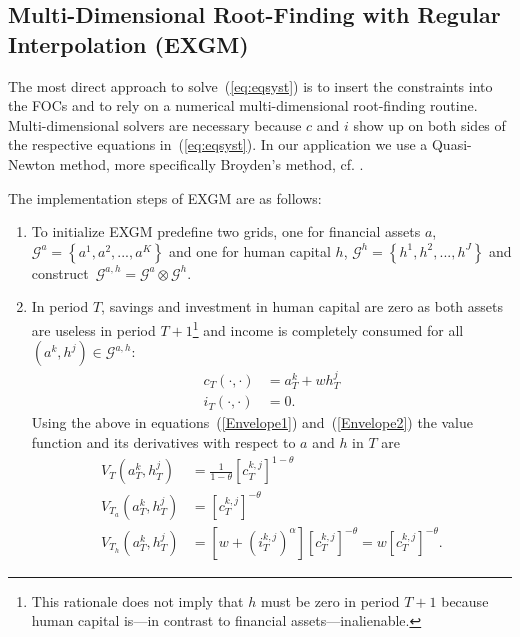 \documentclass[a4paper,12pt]{article}
\begin{document}
\subsection{Multi-Dimensional Root-Finding with Regular Interpolation (EXGM)}

The most direct approach to solve~(\ref{eq:eqsyst}) is to insert the constraints into the FOCs and to rely on a numerical multi-dimensional root-finding routine. Multi-dimensional solvers are necessary because $c$ and $i$ show up on both sides of the respective equations in~(\ref{eq:eqsyst}). In our application we use a Quasi-Newton method, more specifically Broyden's method, cf. .

The implementation steps of EXGM are as follows:

\begin{enumerate}
	\item To initialize EXGM predefine two grids, one for financial assets $a$, $\mathcal{G}^{a}=\left\{a^{1},a^{2},...,a^{K}\right\}$ and one for human capital $h$, $\mathcal{G}^{h}=\left\{h^{1},h^{2},...,h^{J}\right\}$ and construct~$\mathcal{G}^{a,h}=\mathcal{G}^{a}\otimes\mathcal{G}^{h}$.

	\item In period $T$, savings and investment in human capital are zero as both assets are useless in period $T+1$\footnote{This rationale does not imply that $h$ must be zero in period $T+1$ because human capital is---in contrast to financial assets---inalienable.}
	and income is completely consumed for all $\left(a^{k},h^{j}\right) \in \mathcal{G}^{a,h}$:
	\begin{align*}
	c_{T}\left(\cdot,\cdot\right)  &  = a_{T}^{k} + w h_{T}^{j}  \\
	i_{T}\left(\cdot,\cdot\right)  &  = 0 \text{.}
	\end{align*}
	Using the above in equations~(\ref{Envelope1}) and~(\ref{Envelope2}) the value function and its derivatives with respect to $a$ and $h$ in $T$ are
	\begin{align*}
	V_{T}\left(a_{T}^{k},h_{T}^{j}\right)  &  = \frac{1} {1 - \theta} \left[c_{T}^{k,j}\right]^{1-\theta}  \\
	\text{$V_{T_{a}}$}\left(a_{T}^{k},h_{T}^{j}\right)  &  = \left[c_{T}^{k,j}\right]^{-\theta}  \\
	\text{$V_{T_{h}}$}\left(a_{T}^{k},h_{T}^{j}\right)  &  = \left[w + \left(i_{T}^{k,j}\right)^{\alpha}\right] \left[c_{T}^{k,j}\right]^{-\theta} = w \left[c_{T}^{k,j}\right]^{-\theta} \text{.}
	\end{align*}


\end{enumerate}
\end{document}
